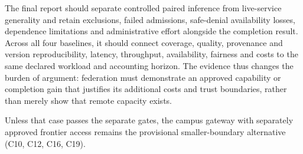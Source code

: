 \documentclass[11pt]{article}
\begin{document}
The final report should separate controlled paired inference from live-service generality and retain exclusions, failed admissions, safe-denial availability losses, dependence limitations and administrative effort alongside the completion result. Across all four baselines, it should connect coverage, quality, provenance and version reproducibility, latency, throughput, availability, fairness and costs to the same declared workload and accounting horizon. The evidence thus changes the burden of argument: federation must demonstrate an approved capability or completion gain that justifies its additional costs and trust boundaries, rather than merely show that remote capacity exists.

Unless that case passes the separate gates, the campus gateway with separately approved frontier access remains the provisional smaller-boundary alternative (C10, C12, C16, C19).
\end{document}
